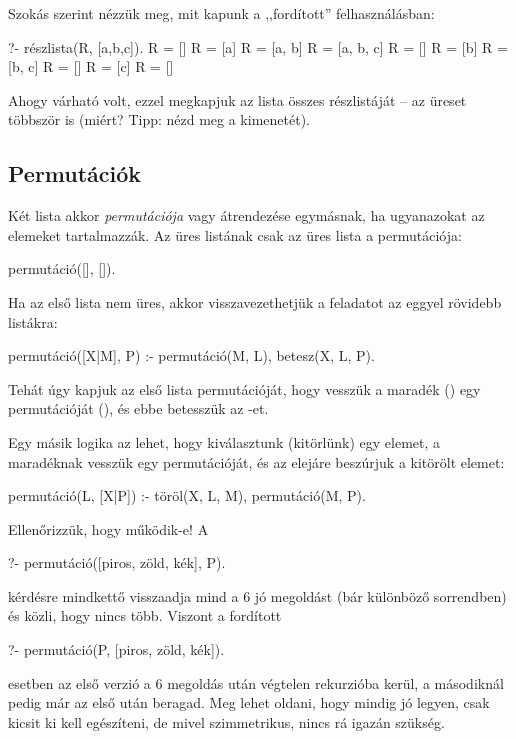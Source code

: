Szokás szerint nézzük meg, mit kapunk a
,,fordított'' felhasználásban:
\begin{query}
?- részlista(R, [a,b,c]).
R = []
R = [a]
R = [a, b]
R = [a, b, c]
R = []
R = [b]
R = [b, c]
R = []
R = [c]
R = []
\end{query}
Ahogy várható volt, ezzel megkapjuk az \pr{[a,b,c]}
lista összes részlistáját -- az üreset többször is
(miért? Tipp: nézd meg a  kimenetét).

\subsection*{Permutációk}
Két lista akkor \emph{permutációja} vagy átrendezése
egymásnak, ha ugyanazokat az elemeket
tartalmazzák. Az üres listának csak az üres lista a
permutációja:
\begin{program}
permutáció([], []).
\end{program}
Ha az első lista nem üres, akkor visszavezethetjük a
feladatot az eggyel rövidebb listákra:
\begin{program}
permutáció([X|M], P) :-
    permutáció(M, L), betesz(X, L, P).
\end{program}
Tehát úgy kapjuk az első lista permutációját, hogy
vesszük a maradék () egy permutációját
(), és ebbe betesszük az -et.

Egy másik logika az lehet, hogy kiválasztunk
(kitörlünk) egy elemet, a maradéknak vesszük egy
permutációját, és az elejáre beszúrjuk a kitörölt
elemet:
\begin{program}
permutáció(L, [X|P]) :-
    töröl(X, L, M), permutáció(M, P).
\end{program}

Ellenőrizzük, hogy működik-e! A
\begin{query}
?- permutáció([piros, zöld, kék], P).
\end{query}
kérdésre mindkettő visszaadja mind a 6 jó megoldást
(bár különböző sorrendben) és közli, hogy nincs
több. Viszont a fordított
\begin{query}
?- permutáció(P, [piros, zöld, kék]).
\end{query}
esetben az első verzió a 6 megoldás után végtelen
rekurzióba kerül, a másodiknál pedig már az első
után beragad. Meg lehet oldani, hogy mindig jó
legyen, csak kicsit ki kell egészíteni, de mivel
szimmetrikus, nincs rá igazán szükség.

